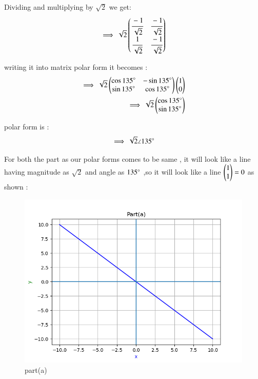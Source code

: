 \begin{enumerate}[label=\thesection.\arabic*.,ref=\thesection.\theenumi]
\begin{enumerate}
Dividing and multiplying by $\sqrt{2}$ we get:
\begin{align}
    \implies \sqrt{2}\begin{pmatrix}\cfrac{-1}{\sqrt{2}} & \cfrac{-1}{\sqrt{2}} \\ \cfrac{1}{\sqrt{2}} & \cfrac{-1}{\sqrt{2}}\end{pmatrix}
\end{align}

writing it into matrix polar form it becomes :
\begin{align}
    \implies \sqrt{2}\begin{pmatrix}\cos{135}\degree & -\sin{135}\degree\\ \sin{135}\degree & \cos{135}\degree\end{pmatrix}\begin{pmatrix}1 \\ 0\end{pmatrix}
\\
    \implies \sqrt{2}\begin{pmatrix}\cos{135}\degree \\ \sin{135}\degree\end{pmatrix}
\end{align}

polar form is :
\begin{align}
    \implies \sqrt{2} \angle 135 \degree
\end{align}

For both the part as our polar forms comes to be same , it will look like a line having magnitude as $\sqrt{2}$ and angle as $135\degree$
,so it will look like a line $\begin{pmatrix}1 \\ 1\end{pmatrix}=0$ as shown :

\renewcommand{\thefigure}{\theenumi.\arabic{figure}}
\begin{figure}[!ht]
    \centering
    \includegraphics[width=\columnwidth]{./figures/MT_A1_a}
\caption{part(a)}
\label{fig: part(a)}
\end{figure}

\end{enumerate}

\end{enumerate}


